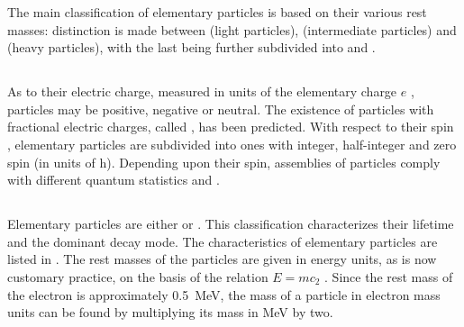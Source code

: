 The main classification of elementary particles is based on their various rest masses: distinction is made between  (light particles),  (intermediate particles) and  (heavy particles), with the last being further subdivided into  and .

\subsection{}\label{43.2.2} As to their electric charge, measured in units of the elementary charge $e$ , particles may be positive, negative
or neutral. The existence of particles with fractional electric charges, called , has been predicted.
With respect to their spin , elementary particles are subdivided into ones with integer, half-integer and zero spin (in units of h). Depending upon their spin, assemblies of particles comply with different quantum statistics  and .

\subsection{}\label{43.2.3} Elementary particles are either  or . This classification characterizes their lifetime and the dominant decay mode. The characteristics of elementary particles are listed in . The rest masses of the particles are given in energy units, as is now customary practice, on the basis of the relation $E = mc_{2}$ . Since the rest mass of the electron is approximately \SI{0.5}{MeV}, the mass of a particle in electron mass units can be found by multiplying its mass in \si{\MeV} by two.

